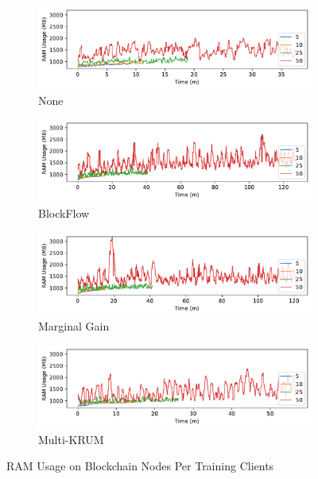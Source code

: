 \begin{figure}[!h]
    \centering
    \begin{subfigure}[b]{0.49\textwidth}
        \centering
        \includegraphics[width=\textwidth]{graphics/clients/ram_none_miner.pdf}
        \caption{None}
    \end{subfigure}
    \hfill
    \begin{subfigure}[b]{0.49\textwidth}
        \centering
        \includegraphics[width=\textwidth]{graphics/clients/ram_blockflow_miner.pdf}
        \caption{BlockFlow}
    \end{subfigure}
    \hfill
    \begin{subfigure}[b]{0.49\textwidth}
        \centering
        \includegraphics[width=\textwidth]{graphics/clients/ram_marginalgain_miner.pdf}
        \caption{Marginal Gain}
    \end{subfigure}
    \hfill
    \begin{subfigure}[b]{0.49\textwidth}
        \centering
        \includegraphics[width=\textwidth]{graphics/clients/ram_multikrum_miner.pdf}
        \caption{Multi-KRUM}
    \end{subfigure}
    \caption{RAM Usage on Blockchain Nodes Per Training Clients}
    \label{fig:ram_clients_degree_miner}
\end{figure}

